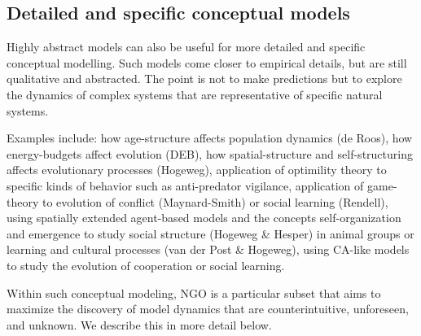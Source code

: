 \subsection{Detailed and specific conceptual models}

Highly abstract models can also be useful for more detailed and specific conceptual modelling. Such models come closer to empirical details, but are still qualitative and abstracted. The point is not to make predictions but to explore the dynamics of complex systems that are representative of specific natural systems. 

Examples include: how age-structure affects population dynamics (de Roos), how energy-budgets affect evolution (DEB), how spatial-structure and self-structuring affects evolutionary processes (Hogeweg), application of optimility theory to specific kinds of behavior such as anti-predator vigilance, application of game-theory to evolution of conflict (Maynard-Smith) or social learning (Rendell), using spatially extended agent-based models and the concepts self-organization and emergence to study social structure (Hogeweg & Hesper) in animal groups or learning and cultural processes (van der Post & Hogeweg), using CA-like models to study the evolution of cooperation or social learning.

Within such conceptual modeling, NGO is a particular subset that aims to maximize the discovery of model dynamics that are counterintuitive, unforeseen, and unknown. We describe this in more detail below.
  